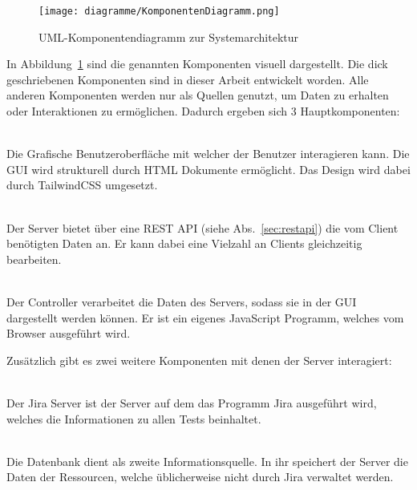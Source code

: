 \begin{figure}[H]
    \texttt{[image: diagramme/KomponentenDiagramm.png]}
    \caption{UML-Komponentendiagramm zur Systemarchitektur}\label{fig:components}
\end{figure}

In Abbildung~\ref{fig:components} sind die genannten Komponenten visuell dargestellt.
Die dick geschriebenen Komponenten sind in dieser Arbeit entwickelt worden. Alle
anderen Komponenten werden nur als Quellen genutzt, um Daten zu erhalten oder Interaktionen zu 
ermöglichen. Dadurch ergeben sich 3 Hauptkomponenten:

\begin{description}
    \hfill\\
    Die Grafische Benutzeroberfläche mit welcher der Benutzer interagieren kann.
    Die \gls{GUI} wird strukturell durch \gls{HTML} Dokumente ermöglicht. 
    Das Design wird dabei durch TailwindCSS umgesetzt.

    \hfill\\
    Der Server bietet über eine \gls{REST} \gls{API} (siehe Abs.~\ref{sec:restapi})
    die vom Client benötigten Daten an. Er kann dabei eine Vielzahl an Clients
    gleichzeitig bearbeiten.

    \newpage

    \hfill\\
    Der Controller verarbeitet die Daten des Servers, sodass sie in der GUI
    dargestellt werden können. Er ist ein eigenes JavaScript Programm,
    welches vom Browser ausgeführt wird.\\
\end{description}

Zusätzlich gibt es zwei weitere Komponenten mit denen der Server interagiert:

\begin{description}
    \hfill\\
    Der \gls{Jira} Server ist der Server auf dem das Programm \gls{Jira} ausgeführt wird, 
    welches die Informationen zu allen Tests beinhaltet.

    \hfill\\
    Die Datenbank dient als zweite Informationsquelle. In ihr speichert der Server
    die Daten der Ressourcen, welche üblicherweise nicht durch \gls{Jira} verwaltet
    werden.
\end{description}

